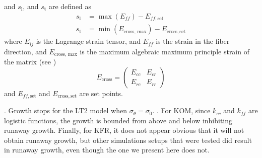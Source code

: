 and $s_\mathrm{l}$, and $s_\mathrm{t}$ are defined as
\begin{align*}
    s_\mathrm{l} &= \max(E_{ff}) - E_{ff, \mathrm{set}} \\
    s_\mathrm{t} &= \min(E_\text{cross, max}) - E_\mathrm{cross, set}
\end{align*}
where $E_{ij}$ is the Lagrange strain tensor, and $E_{ff}$ is the strain in the fiber direction, and $E_\text{cross, max}$ is the maximum algebraic maximum principle strain of the matrix (see \citep{Witzenburg2018})
\begin{equation*}
    E_\text{cross} = \begin{pmatrix}
        E_{cc} & E_{cr} \\
        E_{rc} & E_{rr}
    \end{pmatrix}
\end{equation*}
and $E_{ff, \mathrm{set}}$ and $E_\mathrm{cross, set}$ are set points. \par
{}\citep{Witzenburg2018}. Growth stops for the LT2 model when $\sigma_{\theta} = \sigma_{0}$.
 \citep{Witzenburg2018}. For KOM, since $k_{cc}$ and $k_{ff}$ are logistic functions, the growth is bounded from above and below inhibiting runaway growth. Finally, for KFR, it does not appear obvious that it will not obtain runaway growth, but other simulations setups that were tested did result in runaway growth, even though the one we present here does not.

